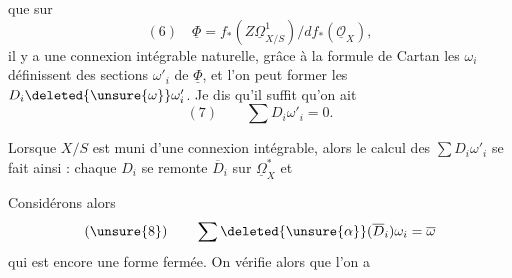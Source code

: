 que  sur
\[
\boxed{(6)\quad \underline\Phi=f_*(Z\underline\Omega^1_{X/S})/df_*(\underline{\mathcal O}_X)},
\]
il y a une connexion intégrable naturelle, grâce à la formule de Cartan  les $\omega_i$ définissent des sections $\omega'_i$ de $\underline\Phi$, et l'on peut former les $D_i\deleted{\unsure{\omega}}\omega'_i$. Je dis qu'il suffit qu'on ait
\[
(7)\qquad \sum D_i\omega'_i=0.
\]

Lorsque $X/S$ est muni d'une connexion intégrable, alors le calcul des $\sum D_i\omega'_i$ se fait ainsi :  chaque $D_i$ se remonte   $\overline D_i$ sur $\underline\Omega^*_X$  et   

\deleted{\[
\boxed{\begin{gathered}
(8)\qquad \alpha_{\overline D_i}\omega_i=\alpha_{\overline D_i^0}\omega_i+c_i\omega_i\\
\left\{\begin{aligned}
\overline D_i&=\overline D_i^0+c_i\,\mathrm{id}\qquad
\left(\begin{array}{l}\overline D_i^0\text{ à coeff. cts}\\c_i\text{ section de }\mathcal O_X\end{array}\right)\\
(9)\qquad \alpha_{\overline D_i^0}d\varphi&=\unsure{d}\overline D_i^0\varphi
\end{aligned}\right.
\end{gathered}}
\]}

Considérons alors
\[
(\unsure{8})\qquad \sum\deleted{\unsure{\alpha}}(\overline D_i)\omega_i=\overline\omega
\]
qui est encore une forme fermée.
On vérifie alors  que l'on a
